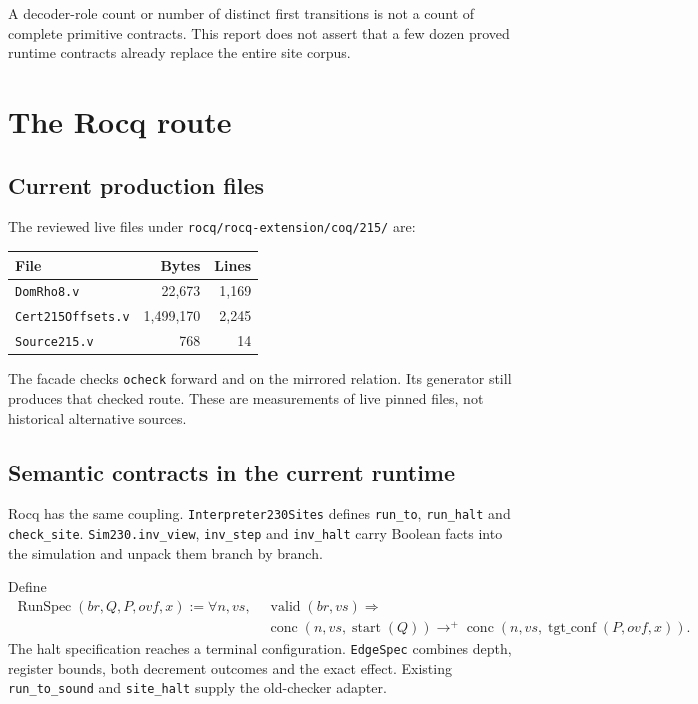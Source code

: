 \documentclass[11pt,letterpaper]{article}
\newcommand{\code}[1]{\texttt{#1}}
\begin{document}
A decoder-role count or number of distinct first transitions is not a count
of complete primitive contracts. This report does not assert that a few dozen
proved runtime contracts already replace the entire site corpus.

\section{The Rocq route}

\subsection{Current production files}

The reviewed live files under \code{rocq/rocq-extension/coq/215/} are:
\begin{center}
\begin{tabular}{lrr}
\toprule
File & Bytes & Lines\\
\midrule
\code{DomRho8.v} & 22,673 & 1,169\\
\code{Cert215Offsets.v} & 1,499,170 & 2,245\\
\code{Source215.v} & 768 & 14\\
\bottomrule
\end{tabular}
\end{center}
The facade checks \code{ocheck} forward and on the mirrored relation. Its
generator still produces that checked route. These are measurements of live
pinned files, not historical alternative sources.

\subsection{Semantic contracts in the current runtime}

Rocq has the same coupling. \code{Interpreter230Sites} defines
\code{run\_to}, \code{run\_halt} and \code{check\_site}.
\code{Sim230.inv\_view}, \code{inv\_step} and \code{inv\_halt} carry Boolean
facts into the simulation and unpack them branch by branch.

Define
\[
\begin{split}
 \operatorname{RunSpec}(br,Q,P,ovf,x):=\forall n,vs,\;&
 \operatorname{valid}(br,vs)\Longrightarrow\\
 &\operatorname{conc}(n,vs,\operatorname{start}(Q))
 \mathrel{\longrightarrow^{+}}
 \operatorname{conc}(n,vs,\operatorname{tgt\_conf}(P,ovf,x)).
\end{split}
\]
The halt specification reaches a terminal configuration. \code{EdgeSpec}
combines depth, register bounds, both decrement outcomes and the exact effect.
Existing \code{run\_to\_sound} and \code{site\_halt} supply the old-checker adapter.
\end{document}
